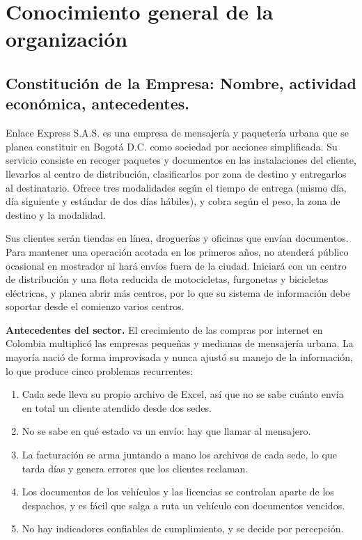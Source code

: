 
\section{Conocimiento general de la organización}

\subsection{Constitución de la Empresa: Nombre, actividad económica, antecedentes.}

Enlace Express S.A.S. es una empresa de mensajería y paquetería urbana
que se planea constituir en Bogotá D.C. como sociedad por acciones
simplificada. Su servicio consiste en recoger paquetes y documentos en
las instalaciones del cliente, llevarlos al centro de distribución,
clasificarlos por zona de destino y entregarlos al destinatario. Ofrece
tres modalidades según el tiempo de entrega (mismo día, día siguiente y
estándar de dos días hábiles), y cobra según el peso, la zona de destino
y la modalidad.

Sus clientes serán tiendas en línea, droguerías y oficinas que envían
documentos. Para mantener una operación acotada en los primeros años, no
atenderá público ocasional en mostrador ni hará envíos fuera de la
ciudad. Iniciará con un centro de distribución y una flota reducida de
motocicletas, furgonetas y bicicletas eléctricas, y planea abrir más
centros, por lo que su sistema de información debe soportar desde el
comienzo varios centros.

\textbf{Antecedentes del sector.} El crecimiento de las compras por
internet en Colombia multiplicó las empresas pequeñas y medianas de
mensajería urbana. La mayoría nació de forma improvisada y nunca ajustó
su manejo de la información, lo que produce cinco problemas recurrentes:

\begin{enumerate}[label=\alph*),leftmargin=1.2cm,itemsep=0pt]
  \item Cada sede lleva su propio archivo de Excel, así que no se sabe
        cuánto envía en total un cliente atendido desde dos sedes.
  \item No se sabe en qué estado va un envío: hay que llamar al
        mensajero.
  \item La facturación se arma juntando a mano los archivos de cada
        sede, lo que tarda días y genera errores que los clientes
        reclaman.
  \item Los documentos de los vehículos y las licencias se controlan
        aparte de los despachos, y es fácil que salga a ruta un vehículo
        con documentos vencidos.
  \item No hay indicadores confiables de cumplimiento, y se decide por
        percepción.
\end{enumerate}

